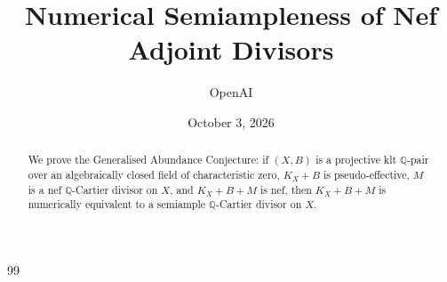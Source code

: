 \documentclass[11pt]{amsart}
\title[Numerical semiampleness of nef adjoint divisors]{Numerical Semiampleness of Nef Adjoint Divisors}
\author{OpenAI}
\date{October 3, 2026}
\numberwithin{equation}{section}
\theoremstyle{definition}
\newcommand{\Q}{\mathbb Q}
\begin{document}
\begin{abstract}
We prove the Generalised Abundance Conjecture: if $(X,B)$ is a projective
klt $\Q$-pair over an algebraically closed field of characteristic zero,
$K_X+B$ is pseudo-effective, $M$ is a nef $\Q$-Cartier divisor on $X$,
and $K_X+B+M$ is nef, then $K_X+B+M$ is numerically equivalent to a
semiample $\Q$-Cartier divisor on $X$.
\end{abstract}
\maketitle
\setcounter{tocdepth}{1}
\tableofcontents








\begin{thebibliography}{99}

\end{thebibliography}
\end{document}
